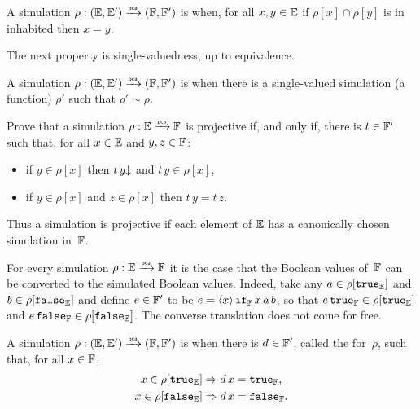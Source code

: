 \begin{definition}
  A simulation $\rho: ({\mathbb{E}}, {\mathbb{E}'}) \xrightarrow{\scriptscriptstyle\mathsf{pca}}{} ({\mathbb{F}}, {\mathbb{F}'})$ is
   when, for all $x, y \in {\mathbb{E}}$ if $\rho[x] \cap \rho[y]$ is in inhabited then $x = y$.
\end{definition}

The next property is single-valuedness, up to equivalence.

\begin{definition}
  A simulation $\rho: ({\mathbb{E}}, {\mathbb{E}'}) \xrightarrow{\scriptscriptstyle\mathsf{pca}}{} ({\mathbb{F}}, {\mathbb{F}'})$ is
   when there is a single-valued simulation (a function) $\rho'$ such that $\rho' \sim \rho$.
\end{definition}

\begin{exercise}
  Prove that a simulation $\rho : {\mathbb{E}} \xrightarrow{\scriptscriptstyle\mathsf{pca}}{} {\mathbb{F}}$ is projective if, and only if,
  there is $t \in {\mathbb{F}'}$ such that, for all $x \in {\mathbb{E}}$ and $y, z \in {\mathbb{F}}$:
  \begin{itemize}
  \item if $y \in \rho[x]$ then $t\,y{\downarrow}$ and $t\,y \in \rho[x]$,
  \item if $y \in \rho[x]$ and $z \in \rho[x]$ then $t \, y = t \, z$.
  \end{itemize}
  Thus a simulation is projective if each element of ${\mathbb{E}}$ has a canonically chosen simulation in~${\mathbb{F}}$.
\end{exercise}


For every simulation $\rho : {\mathbb{E}} \xrightarrow{\scriptscriptstyle\mathsf{pca}}{} {\mathbb{F}}$ it is the case that the Boolean values of~${\mathbb{F}}$ can be converted to the simulated Boolean values. Indeed, take any $a \in \rho[\mathtt{true}_{\mathbb{E}}]$ and $b \in \rho[\mathtt{false}_{\mathbb{E}}]$ and define $e \in {\mathbb{F}}'$ to be
$e = \langle x \rangle\, \mathtt{if}_{\mathbb{F}} \, x \, a \, b$, so that $e \, \mathtt{true}_{\mathbb{F}} \in \rho[\mathtt{true}_{\mathbb{E}}]$ and $e \, \mathtt{false}_{\mathbb{F}} \in \rho[\mathtt{false}_{\mathbb{E}}]$. The converse translation does not come for free.

\begin{definition}
  A simulation $\rho: ({\mathbb{E}}, {\mathbb{E}'}) \xrightarrow{\scriptscriptstyle\mathsf{pca}}{} ({\mathbb{F}}, {\mathbb{F}'})$ is
   when there is $d \in {\mathbb{F}'}$,
  called the
   for~$\rho$, such that, for all $x \in {\mathbb{F}}$,
  \begin{align*}
    x \in \rho[\mathtt{true}_{\mathbb{E}}] &\Rightarrow d \, x = \mathtt{true}_{\mathbb{F}},
    \\
    x \in \rho[\mathtt{false}_{\mathbb{E}}] &\Rightarrow d \, x = \mathtt{false}_{\mathbb{F}}.
  \end{align*}
\end{definition}

